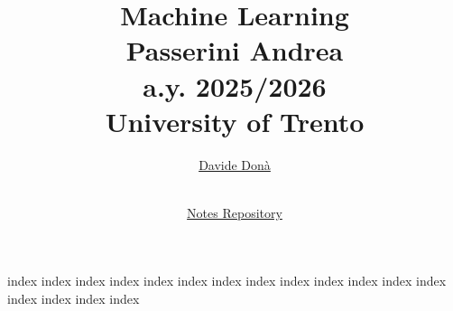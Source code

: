 \documentclass{article}
\title{\Huge \textbf{Machine Learning}\\ \Large{Passerini Andrea\\a.y. 2025/2026\\University of Trento\\[2cm]}}
\author{\href{https://davide-dona.github.io}{Davide Donà}}
\date{
    \MonthName\ \number\year \\[0.5em]
    \small\textcolor{gray}{\href{https://github.com/davide-dona/Machine-Learning-Notes}{Notes Repository}}
}
\numberwithin{equation}{section} %
\begin{document}

\maketitle
\newpage
\tableofcontents
\newpage

{index}
\clearpage
{index}
\clearpage
{index}
\clearpage
{index}
\clearpage
{index}
\clearpage
{index}
\clearpage
{index}
\clearpage
{index}
\clearpage
{index}
\clearpage
{index}
\clearpage
{index}
\clearpage
{index}
\clearpage
{index}
\clearpage
{index}
\clearpage
{index}
\clearpage
{index}
\clearpage
\appendix
{index}
\end{document}
